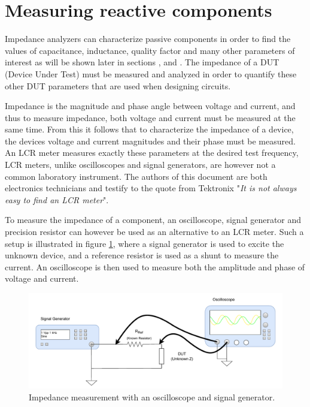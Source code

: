 \section{Measuring reactive components} \label{sec:MeasureReactiveComponents}
Impedance analyzers can characterize passive components in order to find the values of capacitance, inductance, quality factor and many other parameters of interest as will be shown later in sections ,  and . The impedance of a DUT (Device Under Test) must be measured and analyzed in order to quantify these other DUT parameters that are used when designing circuits.

Impedance is the magnitude and phase angle between voltage and current, and thus to measure impedance, both voltage and current must be measured at the same time. From this it follows that to characterize the impedance of a device, the devices voltage and current magnitudes and their phase must be measured. An LCR meter measures exactly these parameters
at the desired test frequency, LCR meters, unlike oscilloscopes and signal generators, are however not a common laboratory instrument. The authors of this document are both
electronics technicians and testify to the quote from Tektronix \Cite{TextronixZMeas} "\textit{It is not always easy to find an LCR meter}". 

To measure the impedance of a component, an oscilloscope, signal generator and precision resistor can however be used as an alternative to an LCR meter. Such a setup is illustrated in figure \ref{fig_2.1_ImpedanceMeas}, where a signal generator is used to excite the unknown device, and a reference resistor is used as a shunt to measure the current. An oscilloscope is then used to measure both the amplitude and phase of voltage and current. 

\begin{figure}[H]
    \centering
    \includegraphics[width=1\textwidth]{Sections/2_ProblemAnalysis/Figures/ScopeGenZMeas.pdf}
    \caption{Impedance measurement with an oscilloscope and signal generator.}
    \label{fig_2.1_ImpedanceMeas}
\end{figure}

